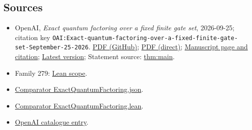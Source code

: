 \documentclass[11pt]{article}
\begin{document}
\subsection{Sources}
\begin{itemize}
\item OpenAI, \emph{Exact quantum factoring over a fixed finite gate set}, 2026-09-25; citation key \texttt{OAI:Exact-quantum-factoring-over-a-fixed-finite-gate-set-September-25-2026}. \href{https://github.com/openai/math/blob/adc7f1241b42e322a6451854ab7e4b4c146bf78a/preprints/Exact-quantum-factoring-over-a-fixed-finite-gate-set-September-25-2026/main.pdf}{PDF (GitHub)}; \href{https://github.com/openai/math/raw/adc7f1241b42e322a6451854ab7e4b4c146bf78a/preprints/Exact-quantum-factoring-over-a-fixed-finite-gate-set-September-25-2026/main.pdf}{PDF (direct)}; \href{https://github.com/openai/math/blob/adc7f1241b42e322a6451854ab7e4b4c146bf78a/preprints/Exact-quantum-factoring-over-a-fixed-finite-gate-set-September-25-2026/README.md}{Manuscript page and citation}; \href{https://github.com/openai/math/blob/main/preprints/Exact-quantum-factoring-over-a-fixed-finite-gate-set-September-25-2026/main.pdf}{Latest version}; Statement source: \href{https://github.com/openai/math/blob/adc7f1241b42e322a6451854ab7e4b4c146bf78a/preprints/Exact-quantum-factoring-over-a-fixed-finite-gate-set-September-25-2026/build/sections/01-introduction.tex\#L10}{thm:main}.
\item Family 279: \href{https://github.com/openai/math/blob/adc7f1241b42e322a6451854ab7e4b4c146bf78a/lean/docs/279.md}{Lean scope}.
\item \href{https://github.com/openai/math/blob/adc7f1241b42e322a6451854ab7e4b4c146bf78a/lean/ComparatorChallenges/ExactQuantumFactoring.json}{Comparator ExactQuantumFactoring.json}.
\item \href{https://github.com/openai/math/blob/adc7f1241b42e322a6451854ab7e4b4c146bf78a/lean/ComparatorChallenges/ExactQuantumFactoring.lean}{Comparator ExactQuantumFactoring.lean}.
\item \href{https://github.com/openai/math/blob/adc7f1241b42e322a6451854ab7e4b4c146bf78a/CONTENTS.md}{OpenAI catalogue entry}.
\end{itemize}
\end{document}
